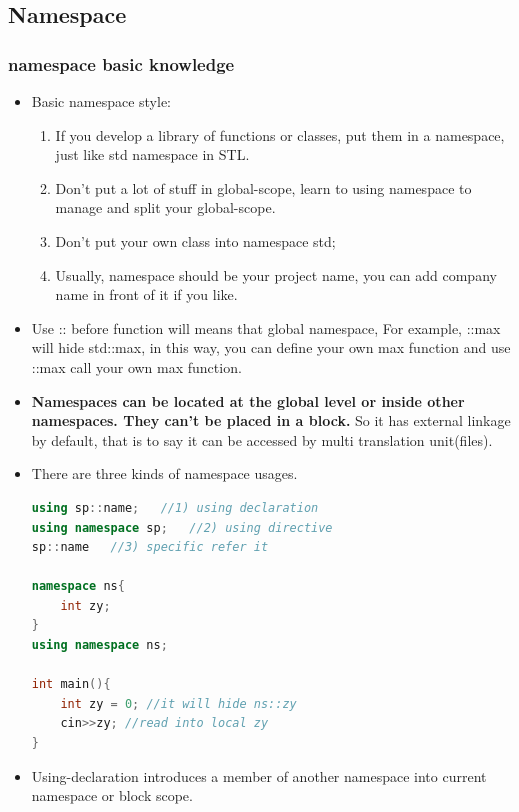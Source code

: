 \documentclass[a4paper,12pt,twoside]{book}
\begin{document}
\subsection{Namespace}
\subsubsection{namespace basic knowledge}
\begin{itemize}
	\item Basic namespace style:
	\begin{enumerate}
		\item If you develop a library of functions or classes, put them in a namespace, just like std namespace in STL.
		
		\item Don't put a lot of stuff in global-scope, learn to using namespace to manage and split your global-scope. 
		
		\item Don't put your own class into namespace std;
		
		\item Usually, namespace should be your project name, you can add company name in front of it if you like.
	\end{enumerate}
	
	
	\item Use :: before function will means that global namespace, For example, ::max will hide std::max, in this way, you can define your own max function and use ::max call your own max function. 
	
	\item \textbf{ Namespaces can be located at the global level or inside other namespaces. They can't be placed in a block.} So it has external linkage by default, that is to say it can be accessed by multi translation unit(files).
	
	
	\item There are three kinds of namespace usages.
\begin{lstlisting}[frame=single, language=c++]
using sp::name;   //1) using declaration
using namespace sp;   //2) using directive
sp::name   //3) specific refer it

namespace ns{
	int zy;
}
using namespace ns;

int main(){
	int zy = 0; //it will hide ns::zy
	cin>>zy; //read into local zy
}
\end{lstlisting}
	
	\item Using-declaration introduces a member of another namespace into current namespace or block scope.
	

\end{itemize}
\end{document}
